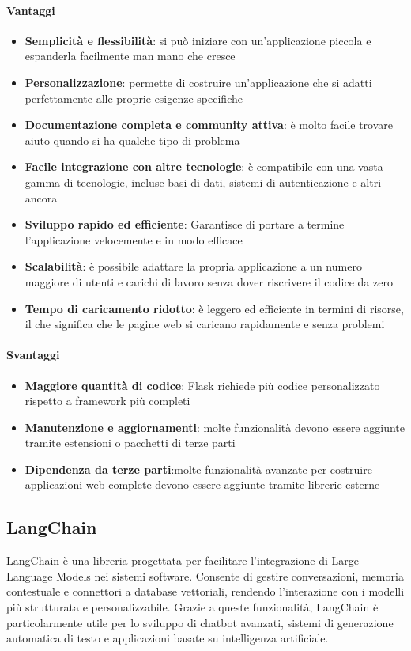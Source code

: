 \documentclass{article}
\begin{document}
\paragraph*{Vantaggi}
\begin{itemize}
    \item \textbf{Semplicità e flessibilità}: si può iniziare con 
    un’applicazione piccola e espanderla facilmente man mano che cresce
    \item \textbf{Personalizzazione}: permette di costruire 
    un’applicazione che si adatti perfettamente alle proprie esigenze 
    specifiche
    \item \textbf{Documentazione completa e community attiva}: è molto 
    facile trovare aiuto quando si ha qualche tipo di problema
    \item \textbf{Facile integrazione con altre tecnologie}: è 
    compatibile con una vasta gamma di tecnologie, incluse basi di dati, 
    sistemi di autenticazione e altri ancora
    \item \textbf{Sviluppo rapido ed efficiente}: Garantisce di portare 
    a termine l’applicazione velocemente e in modo efficace
    \item \textbf{Scalabilità}: è possibile adattare la propria 
    applicazione a un numero maggiore di utenti e carichi di lavoro 
    senza dover riscrivere il codice da zero
    \item \textbf{Tempo di caricamento ridotto}: è leggero ed efficiente 
    in termini di risorse, il che significa che le pagine web si 
    caricano rapidamente e senza problemi
\end{itemize}
\paragraph*{Svantaggi}
\begin{itemize}
    \item \textbf{Maggiore quantità di codice}: Flask richiede più 
    codice personalizzato rispetto a framework più completi
    \item \textbf{Manutenzione e aggiornamenti}:  molte funzionalità 
    devono essere aggiunte tramite estensioni o pacchetti di terze parti
    \item \textbf{Dipendenza da terze parti}:molte funzionalità 
    avanzate per costruire applicazioni web complete devono essere 
    aggiunte tramite librerie esterne
\end{itemize}

\subsection{LangChain}
LangChain è una libreria progettata per facilitare l'integrazione di Large Language Models nei sistemi software. 
Consente di gestire conversazioni, memoria contestuale e connettori a database vettoriali, 
rendendo l'interazione con i modelli più strutturata e personalizzabile. 
Grazie a queste funzionalità, LangChain è particolarmente utile per lo sviluppo di chatbot avanzati, 
sistemi di generazione automatica di testo e applicazioni basate su intelligenza artificiale.
\end{document}

